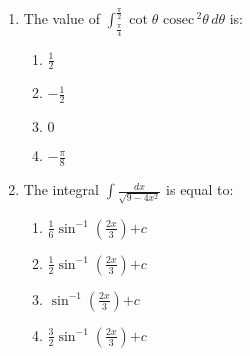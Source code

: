 \documentclass[12pt,-letter paper]{article}
\newcommand{\cosec}{\,\text{cosec}\,}
\providecommand{\brak}[1]{\ensuremath{\left(#1\right)}}
\begin{document}
	         \begin{enumerate}                                                   \item The value of  $ \int_{\frac{\pi}{4}}^{\frac{\pi}{2}} \cot \theta \, \cosec^2 \theta \, d\theta $ is:                                      \begin{enumerate}[label={$\brak{\Alph*}$}]                                             \item $\frac{1}{2}$
                            \item $ -\frac{1}{2} $
                            \item $ 0 $                                                             \item $ -\frac{\pi}{8} $                                                \end{enumerate}                                                                                                        \item The integral $ \int \frac{dx}{\sqrt{9-4x^2}} $ is equal to:                                                                                           \begin{enumerate}[label={$\brak{\Alph*}$}]
        \item $ \frac{1}{6} \sin^{-1} $\brak{\frac{2x}{3}}$ + c $      
        \item $ \frac{1}{2} \sin^{-1} $\brak{\frac{2x}{3}}$ + c $
        \item $\sin^{-1} $\brak{ \frac{2x}{3}}$ + c $                           \item $ \frac{3}{2} \sin^{-1} $\brak{ \frac{2x}{3} }$ + c $                           \end{enumerate}
                      \end{enumerate}
\end{document}
